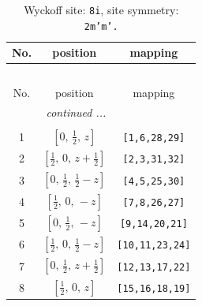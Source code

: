 \documentclass[fleqn,8pt]{jsarticle}
\begin{document}
\renewcommand{\arraystretch}{1.2}
\begin{longtable}{ccc}
\caption{Wyckoff site: {\tt 8i}, site symmetry: {\tt 2m'm'.}}
 \\
 \hline \hline
No. & position & mapping \\ \hline \endfirsthead

\multicolumn{2}{l}{\tablename\ \thetable{}} \\
 \hline \hline
No. & position & mapping \\ \hline \endhead

 \hline \hline
\multicolumn{2}{r}{\footnotesize\it continued ...} \\ \endfoot

 \hline \hline
\multicolumn{2}{r}{} \\ \endlastfoot

1 & $\left[ 0,\, \frac{1}{2},\, z \right]$ & {\tt [1,6,28,29]} \\ \hline
2 & $\left[ \frac{1}{2},\, 0,\, z + \frac{1}{2} \right]$ & {\tt [2,3,31,32]} \\ \hline
3 & $\left[ 0,\, \frac{1}{2},\, \frac{1}{2} - z \right]$ & {\tt [4,5,25,30]} \\ \hline
4 & $\left[ \frac{1}{2},\, 0,\, - z \right]$ & {\tt [7,8,26,27]} \\ \hline
5 & $\left[ 0,\, \frac{1}{2},\, - z \right]$ & {\tt [9,14,20,21]} \\ \hline
6 & $\left[ \frac{1}{2},\, 0,\, \frac{1}{2} - z \right]$ & {\tt [10,11,23,24]} \\ \hline
7 & $\left[ 0,\, \frac{1}{2},\, z + \frac{1}{2} \right]$ & {\tt [12,13,17,22]} \\ \hline
8 & $\left[ \frac{1}{2},\, 0,\, z \right]$ & {\tt [15,16,18,19]} \\
\end{longtable}
\renewcommand{\arraystretch}{1.2}
\end{document}
